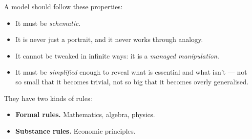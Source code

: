 \documentclass[a4paper,12pt]{article}
\begin{document}
\noindent A model should follow these properties:
\begin{itemize}
	\item It must be \emph{schematic}.
	\item It is never just a portrait, and it never works through analogy.
	\item It cannot be tweaked in infinite ways: it is a \emph{managed manipulation}.
	\item It must be \emph{simplified} enough to reveal what is essential and what isn't --- not so small that it becomes trivial, not so big that it becomes overly generalised.
\end{itemize}

\noindent They have two kinds of rules:
\begin{itemize}
	\item \textbf{Formal rules.} Mathematics, algebra, physics.
	\item \textbf{Substance rules.} Economic principles.
\end{itemize}
\end{document}
